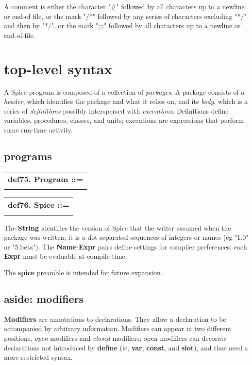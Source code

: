 \documentclass{report}
\begin{document}
A comment is either the character "\#"
followed by all characters up to a newline or
end-of file, or the mark "/*" followed by any series of characters excluding
"*/" and then by "*/", or the mark ";;;" followed by all characters up to a
newline or end-of-file.\chapter{top-level syntax}


A Spice program is composed of a collection of {\em packages}. A package
consists of a {\em header}, which identifies the package and what it relies
on, and its {\em body}, which is a series of {\em definitions} possibly
interspersed with {\em executions}. Definitions define variables,
procedures, classes, and units; executions are expressions
that perform some run-time activity.

\section{programs}


\begin{tabular}{l}
{\bf def75. Program ::= }\\ 
\hspace*{3mm}{\tt Spice (Package* $\mid$ PackageBody)} \\ 
\end{tabular}

\begin{tabular}{l}
{\bf def76. Spice ::= }\\ 
\hspace*{3mm}{\tt "spice" String ("," (Name ":" Expr))*} \\ 
\end{tabular}

The {\bf String} identifies the version of Spice that the writer assumed
when the package was written; it is a dot-separated sequences of
integers or names (eg "1.0" or "5.beta"). The {\bf Name}-{\bf Expr} pairs
define settings for compiler preferences; each {\bf Expr} must be
evaluable at compile-time.

The {\bf spice} preamble is intended for future expansion.\section{aside: modifiers}


{\bf Modifiers} are annotations to declarations. They allow a declaration to be
accompanied by arbitrary information. Modifiers can appear in two different
positions, {\em open} modifiers and {\em closed} modifiers; open modifiers can
decorate declarations not introduced by {\bf define} (ie, {\bf var}, {\bf const}, and
{\bf slot}), and thus need a more restricted syntax.
\end{document}
